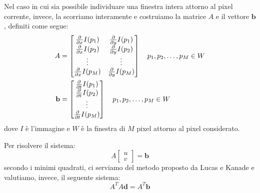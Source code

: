 \documentclass{article}
\begin{document}
Nel caso in cui sia possibile individuare una finestra intera attorno al pixel corrente, invece, la scorriamo interamente e costruiamo la matrice $A$ e il vettore $\mathbf{b}$, definiti come segue:
\begin{align}
A &= \begin{bmatrix}
{\partial \over \partial x}I(p_1) & {\partial \over \partial y}I(p_1) \\
{\partial \over \partial x}I(p_2) & {\partial \over \partial y}I(p_2) \\
\vdots & \vdots \\
{\partial \over \partial x}I(p_M) & {\partial \over \partial y}I(p_M)
\end{bmatrix} \quad p_1, p_2, \ldots, p_M \in W \\
\mathbf{b} &=  \begin{bmatrix}
{\partial \over \partial t}I(p_1) \\
{\partial \over \partial t}I(p_2) \\
\vdots \\
{\partial \over \partial t}I(p_M) \\
\end{bmatrix} \quad p_1, p_2, \ldots, p_M \in W
\end{align}
dove $I$ è l'immagine e $W$ è la finestra di $M$ pixel attorno al pixel considerato.

Per risolvere il sistema:
\begin{equation}
A \begin{bmatrix}
u \\
v
\end{bmatrix} = \mathbf{b}
\end{equation}
secondo i minimi quadrati, ci serviamo del metodo proposto da Lucas e Kanade e valutiamo, invece, il seguente sistema:
\begin{equation}
A^T A \mathbf{d} = A^T \mathbf{b}
\end{equation}
\end{document}
